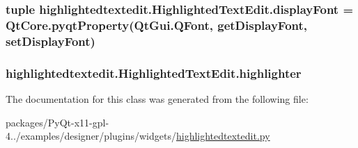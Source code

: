\subsubsection[{display\+Font}]{\setlength{\rightskip}{0pt plus 5cm}tuple highlightedtextedit.\+Highlighted\+Text\+Edit.\+display\+Font = Qt\+Core.\+pyqt\+Property(Qt\+Gui.\+Q\+Font, {\bf get\+Display\+Font}, {\bf set\+Display\+Font})\hspace{0.3cm}{\ttfamily [static]}}\label{classhighlightedtextedit_1_1HighlightedTextEdit_a1f23bcb4aac01b6df6a634439b813cae}
\hypertarget{classhighlightedtextedit_1_1HighlightedTextEdit_af353c0b684a95cd4eb35bcac4cb1ebbb}{}
\subsubsection[{highlighter}]{\setlength{\rightskip}{0pt plus 5cm}highlightedtextedit.\+Highlighted\+Text\+Edit.\+highlighter}\label{classhighlightedtextedit_1_1HighlightedTextEdit_af353c0b684a95cd4eb35bcac4cb1ebbb}


The documentation for this class was generated from the following file\+:\begin{DoxyCompactItemize}
\item 
packages/\+Py\+Qt-\/x11-\/gpl-\/4../examples/designer/plugins/widgets/\hyperlink{highlightedtextedit_8py}{highlightedtextedit.\+py}\end{DoxyCompactItemize}
